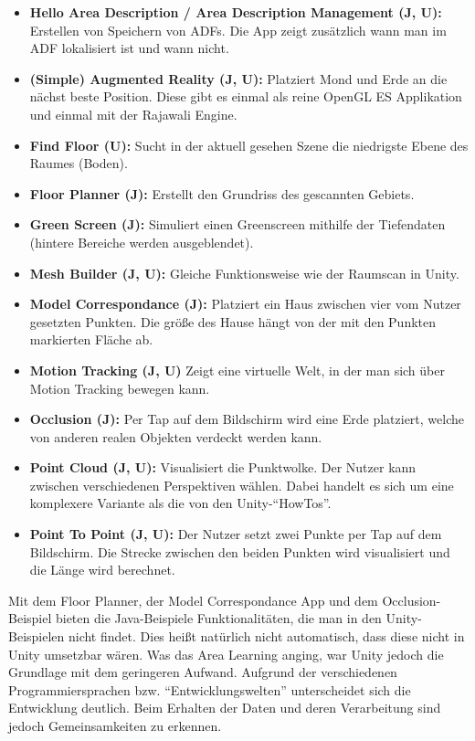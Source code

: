 \begin{itemize}
	\item\textbf{Hello Area Description / Area Description Management (J, U):} Erstellen von Speichern von ADFs. Die App zeigt zusätzlich wann man im ADF lokalisiert ist und wann nicht.
	\item\textbf{(Simple) Augmented Reality (J, U):} Platziert Mond und Erde an die nächst beste Position. Diese gibt es einmal als reine OpenGL ES Applikation und einmal mit der Rajawali Engine.
	\item\textbf{Find Floor (U):} Sucht in der aktuell gesehen Szene die niedrigste Ebene des Raumes (Boden).
	\item\textbf{Floor Planner (J):} Erstellt den Grundriss des gescannten Gebiets.
	\item\textbf{Green Screen (J):} Simuliert einen Greenscreen mithilfe der Tiefendaten (hintere Bereiche werden ausgeblendet).
	\item\textbf{Mesh Builder (J, U):} Gleiche Funktionsweise wie der Raumscan in Unity.
	\item\textbf{Model Correspondance (J):} Platziert ein Haus zwischen vier vom Nutzer gesetzten Punkten. Die größe des Hause hängt von der mit den Punkten markierten Fläche ab.
	\item\textbf{Motion Tracking (J, U)} Zeigt eine virtuelle Welt, in der man sich über Motion Tracking bewegen kann.
	\item\textbf{Occlusion (J):} Per Tap auf dem Bildschirm wird eine Erde platziert, welche von anderen realen Objekten verdeckt werden kann.
	\item\textbf{Point Cloud (J, U):} Visualisiert die Punktwolke. Der Nutzer kann zwischen verschiedenen Perspektiven wählen. Dabei handelt es sich um eine komplexere Variante als die von den Unity-"`HowTos"'.
	\item\textbf{Point To Point (J, U):} Der Nutzer setzt zwei Punkte per Tap auf dem Bildschirm. Die Strecke zwischen den beiden Punkten wird visualisiert und die Länge wird berechnet.
\end{itemize}

Mit dem Floor Planner, der Model Correspondance App und dem Occlusion-Beispiel bieten die Java-Beispiele Funktionalitäten, die man in den Unity-Beispielen nicht findet. Dies heißt natürlich nicht automatisch, dass diese nicht in Unity umsetzbar wären. Was das Area Learning anging, war Unity jedoch die Grundlage mit dem geringeren Aufwand. Aufgrund der verschiedenen Programmiersprachen bzw. "`Entwicklungswelten"' unterscheidet sich die Entwicklung deutlich. Beim Erhalten der Daten und deren Verarbeitung sind jedoch Gemeinsamkeiten zu erkennen.